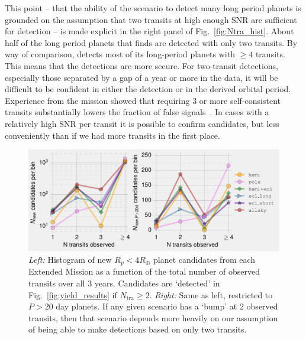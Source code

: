 \begin{enumerate}
	This point -- that the ability of the \hemis\:scenario to detect many long period planets is grounded on the assumption that two transits at high enough SNR are sufficient for detection -- is made explicit in the right panel of Fig.~\ref{fig:Ntra_hist}.
	About half of the long period planets that \hemis\:finds are detected with only two transits.
	By way of comparison, \npole\:detects most of its long-period planets with $\ge 4$ transits.
	This means that the \npole\:detections are more secure.
	For two-transit detections, especially those separated by a gap of a year or more in the \tess data, it will be
        difficult to be confident in either the detection or in the derived 
        orbital period.
        Experience from the \kepler mission showed that requiring 3 or more self-consistent transits substantially lowers the fraction of false signals~\citep{burke_Q1Q8_2014}.
	In cases with a relatively high SNR per transit it is possible to confirm 
	candidates, but less conveniently than if we had more transits in the first 
	place.
	\begin{figure}[!t]
		\centering
		\includegraphics[scale=1.]{figures/Ntra_histogram.pdf}
		\caption{ \textit{Left:} Histogram of new $R_p<4R_\oplus$ planet 
		candidates from each Extended Mission as a function of the total number of 
		observed transits over all 3 years.
		Candidates are `detected' in Fig.~\protect\ref{fig:yield_results} if $N_\mathrm{tra}\geq2$.
		\textit{Right:} Same as left, restricted to $P>20$ day planets.
		If any given scenario has a `bump' at 2 observed transits, then that scenario depends more heavily on our assumption of being able to make detections based on only two transits.
}
\end{figure}
\end{enumerate}
